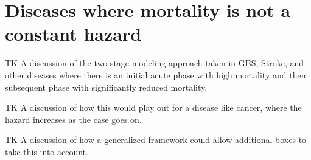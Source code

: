 \section{ Diseases where mortality is not a constant hazard}

TK A discussion of the two-stage modeling approach taken in GBS,
Stroke, and other diseases where there is an initial acute phase with
high mortality and then subsequent phase with significantly reduced
mortality.

TK A discussion of how this would play out for a disease like cancer,
where the hazard increases as the case goes on.

TK A discussion of how a generalized framework could allow additional
boxes to take this into account.

